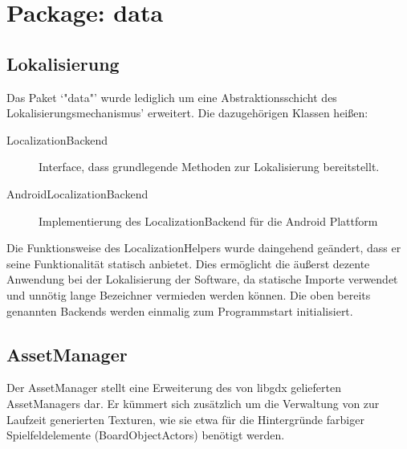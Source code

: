 \section{Package: data}
\subsection{Lokalisierung}
Das Paket `"data"' wurde lediglich um eine Abstraktionsschicht des Lokalisierungsmechanismus' erweitert.
Die dazugehörigen Klassen heißen:
\begin{description}
	\item[LocalizationBackend] Interface, dass grundlegende Methoden zur Lokalisierung bereitstellt.
	\item[AndroidLocalizationBackend] Implementierung des LocalizationBackend für die Android Plattform
\end{description}

Die Funktionsweise des LocalizationHelpers wurde daingehend geändert, dass er seine Funktionalität statisch anbietet.
Dies ermöglicht die äußerst dezente Anwendung bei der Lokalisierung der Software, da statische Importe verwendet und unnötig lange Bezeichner vermieden werden können.
Die oben bereits genannten Backends werden einmalig zum Programmstart initialisiert.


\subsection{AssetManager}
Der AssetManager stellt eine Erweiterung des von libgdx gelieferten AssetManagers dar.
Er kümmert sich zusätzlich um die Verwaltung von zur Laufzeit generierten Texturen, wie sie etwa für die Hintergründe farbiger Spielfeldelemente (BoardObjectActors) benötigt werden.
